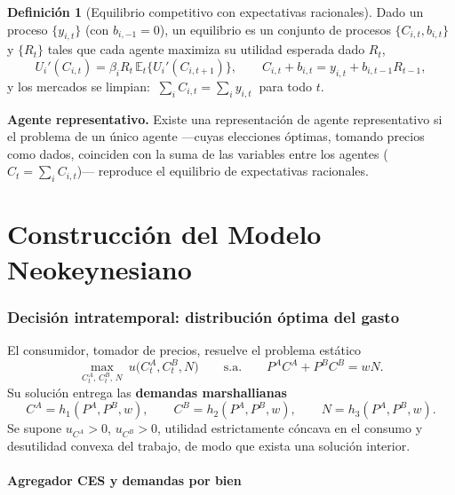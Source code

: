 \documentclass[11pt]{article}
\newenvironment{notabox}[1][Nota]%
  {\par\medskip\noindent\textbf{#1.}\enspace\ignorespaces}%
  {\par\medskip}
\theoremstyle{definition}
\newtheorem{definicion}{Definición}[section]
\newcommand{\E}{\mathbb{E}}
\begin{document}
\begin{definicion}[Equilibrio competitivo con expectativas racionales]
Dado un proceso $\{y_{i,t}\}$ (con $b_{i,-1}=0$), un equilibrio es un conjunto de procesos
$\{C_{i,t},b_{i,t}\}$ y $\{R_{t}\}$ tales que cada agente maximiza su utilidad esperada dado $R_{t}$,
\[
U_{i}'(C_{i,t})=\beta_{i}R_{t}\,\E_{t}\{U_{i}'(C_{i,t+1})\},
\qquad
C_{i,t}+b_{i,t}=y_{i,t}+b_{i,t-1}R_{t-1},
\]
y los mercados se limpian: $\ \sum_{i}C_{i,t}=\sum_{i}y_{i,t}\ $ para todo $t$.
\end{definicion}

\begin{notabox}[Agente representativo]
Existe una representación de agente representativo si el problema de un único agente ---cuyas
elecciones óptimas, tomando precios como dados, coinciden con la suma de las variables entre los
agentes ($C_{t}=\sum_{i}C_{i,t}$)--- reproduce el equilibrio de expectativas racionales.
\end{notabox}

\part{Construcción del Modelo Neokeynesiano}

\section{Decisión intratemporal: distribución óptima del gasto}

El consumidor, tomador de precios, resuelve el problema estático
\begin{equation}
\max_{C^{A}_{t},\,C^{B}_{t},\,N}\ u\big(C^{A}_{t},C^{B}_{t},N\big)
\qquad\text{s.a.}\qquad
P^{A}C^{A}+P^{B}C^{B}=wN .
\end{equation}
Su solución entrega las \textbf{demandas marshallianas}
\begin{equation}
C^{A}=h_{1}(P^{A},P^{B},w),\qquad
C^{B}=h_{2}(P^{A},P^{B},w),\qquad
N=h_{3}(P^{A},P^{B},w).
\end{equation}
Se supone $u_{C^{A}}>0$, $u_{C^{B}}>0$, utilidad estrictamente cóncava en el consumo y desutilidad
convexa del trabajo, de modo que exista una solución interior.

\subsection{Agregador CES y demandas por bien}
\end{document}
